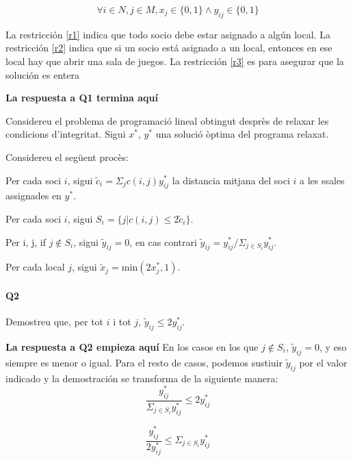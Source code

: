 \begin{equation}
\label{r3}
 \forall i \in N, j \in M, x_j \in \{0,1\} \wedge y_{ij} \in \{0,1\} 
\end{equation}

La restricción \ref{r1} indica que todo socio debe estar asignado a algún local. La restricción \ref{r2} indica que si un socio está asignado a un local, entonces en ese local hay que abrir una sala de juegos. La restricción \ref{r3} es para asegurar que la solución es entera

\textbf{La respuesta a Q1 termina aquí}

Considereu el problema de programació lineal obtingut desprès de relaxar les condicions d'integritat. Sigui $x^*$, $y^*$ una solució òptima del programa relaxat.

Considereu el següent procès:
\begin{enumerate}[label=(\alph*)]{
\item Per cada soci $i$, sigui $\tilde{c}_i =  \Sigma_j c(i,j)y^*_{ij} $ la distancia mitjana del soci $i$ a les ssales assignades en $y^*$.
\item Per cada soci $i$, sigui $S_i = \{j | c(i,j) \leq 2\tilde{c}_i\}$.
\item Per i, j, if $j \notin S_i$, sigui $\tilde{y}_{ij} = 0$, en cas contrari $\tilde{y}_{ij} = y^*_{ij}/\Sigma_{j \in S_i} y^*_{ij}$.
\item Per cada local $j$, sigui $\tilde{x}_j = \textrm{min}(2x^*_j, 1)$. 
}

\end{enumerate}

\paragraph{Q2}
Demostreu que, per tot $i$ i tot $j$, $\tilde{y}_{ij} \leq 2y^*_{ij}$.

\textbf{La respuesta a Q2 empieza aquí}
En los casos en los que $j \notin S_i$, $\tilde{y}_{ij} = 0$, y eso siempre es menor o igual.
Para el resto de casos, podemos sustiuir $\tilde{y}_{ij}$ por el valor indicado y la demostración se transforma de la siguiente manera:
\begin{equation}
 \frac{y^*_{ij}}{\Sigma_{j \in S_i} y^*_{ij}} \leq 2y^*_{ij}
\end{equation}

\begin{equation}
 \frac{y^*_{ij}}{2y^*_{ij}} \leq \Sigma_{j \in S_i} y^*_{ij}
\end{equation}

